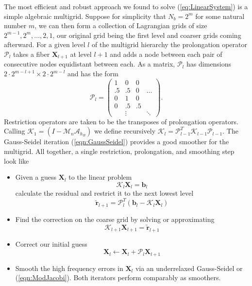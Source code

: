 \documentclass[preprint,12pt]{elsarticle}
\begin{document}
The most efficient and robust approach we found to solve  (\ref{eq:LinearSystem}) is a simple algebraic multigrid. Suppose for simplicity that $N_b=2^m$ for some natural number $m$, we can then form a collection of Lagrangian grids of size $2^{m-1},2^m,\dots,2,1$, our original grid being the first level and coarser grids coming afterward.
For a given level $l$ of the multigrid hierarchy the prolongation operator $\mathcal{P}_l$ takes a fiber $\mathbf{X}_{l+1}$ at level $l+1$ and adds a node between each pair of consecutive nodes equidistant between each. As a matrix,  $\mathcal{P}_l$ has dimensions $2\cdot 2^{m-l+1}\times 2\cdot 2^{m-l}$ and has the form
\begin{equation}
\mathcal{P}_l = 
\left( \begin{array}{cccc}
1  & 0  & 0  &  \\
.5 & .5 & 0  & \dots \\
0  & 1  & 0  & \\
0  & .5 & .5 & \\
   &\vdots& & \ddots
\end{array} \right).
\end{equation}
Restriction operators are taken to be the transposes of prolongation operators. Calling $\mathcal{K}_1 = (\mathit{I}- \mathcal{M}_n\mathcal{A}_{h_B})$ we define recursively $\mathcal{K}_l = \mathcal{P}_{l-1}^{\mathit{T}} \mathcal{K}_{l-1} \mathcal{P}_{l-1}$. The Gauss-Seidel iteration (\ref{eqn:GaussSeidel}) provides a good smoother for the multigrid.
All together,  a single restriction, prolongation, and smoothing step look like
\begin{itemize}
\item Given a guess $\mathbf{X}_l$ to the linear problem
\begin{equation}
\mathcal{K}_l\mathbf{X}_l = \mathbf{b}_l
\end{equation}
calculate the residual and restrict it to the next lowest level
\begin{equation}
\tilde{\mathbf{r}}_{l+1} = \mathcal{P}_l^T(\mathbf{b}_l - \mathcal{K}_l\mathbf{X}_l)
\end{equation}
\item Find the correction on the coarse grid by solving or approximating
\begin{equation}
\mathcal{K}_{l+1}\mathbf{X}_{l+1} = \tilde{\mathbf{r}}_{l+1}
\end{equation}
\item Correct our initial guess
\begin{equation}
\mathbf{X}_l \leftarrow \mathbf{X}_l + \mathcal{P}_l \mathbf{X}_{l+1}
\end{equation}
\item Smooth the high frequency errors in $\mathbf{X}_l$ via an underrelaxed Gauss-Seidel or (\ref{eqn:ModJacobi}). Both iterators perform comparably as smoothers.
\end{itemize}
\end{document}
